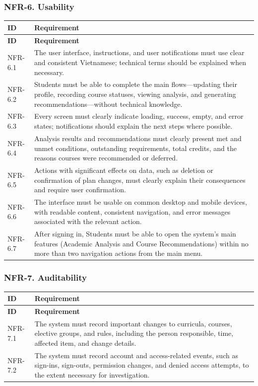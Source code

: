 \subsubsection{NFR-6. Usability}
\begin{longtable}{|p{}|p{}|}
\hline
\textbf{ID} & \textbf{Requirement} \\
\hline
\endfirsthead
\hline
\textbf{ID} & \textbf{Requirement} \\
\hline
\endhead
NFR-6.1 & The user interface, instructions, and user notifications must use clear and consistent Vietnamese; technical terms should be explained when necessary. \\
\hline
NFR-6.2 & Students must be able to complete the main flows---updating their profile, recording course statuses, viewing analysis, and generating recommendations---without technical knowledge. \\
\hline
NFR-6.3 & Every screen must clearly indicate loading, success, empty, and error states; notifications should explain the next steps where possible. \\
\hline
NFR-6.4 & Analysis results and recommendations must clearly present met and unmet conditions, outstanding requirements, total credits, and the reasons courses were recommended or deferred. \\
\hline
NFR-6.5 & Actions with significant effects on data, such as deletion or confirmation of plan changes, must clearly explain their consequences and require user confirmation. \\
\hline
NFR-6.6 & The interface must be usable on common desktop and mobile devices, with readable content, consistent navigation, and error messages associated with the relevant action. \\
\hline
NFR-6.7 & After signing in, Students must be able to open the system's main features (Academic Analysis and Course Recommendations) within no more than two navigation actions from the main menu. \\
\hline
\end{longtable}

\subsubsection{NFR-7. Auditability}
\begin{longtable}{|p{}|p{}|}
\hline
\textbf{ID} & \textbf{Requirement} \\
\hline
\endfirsthead
\hline
\textbf{ID} & \textbf{Requirement} \\
\hline
\endhead
NFR-7.1 & The system must record important changes to curricula, courses, elective groups, and rules, including the person responsible, time, affected item, and change details. \\
\hline
NFR-7.2 & The system must record account and access-related events, such as sign-ins, sign-outs, permission changes, and denied access attempts, to the extent necessary for investigation. \\
\hline
\end{longtable}


